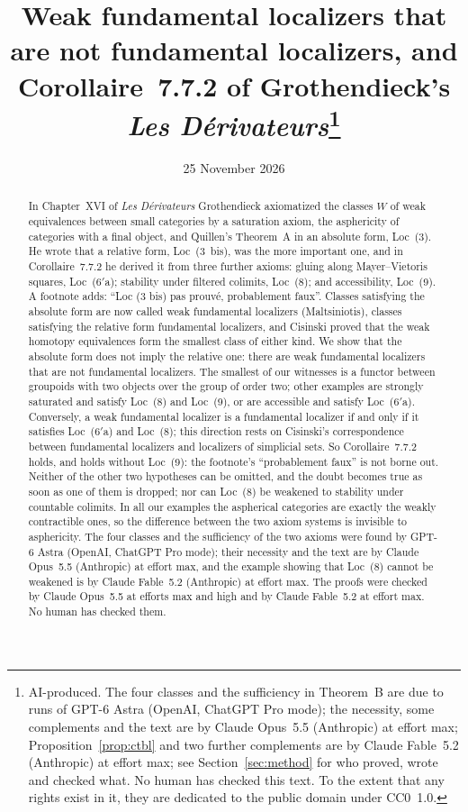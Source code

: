 \documentclass[11pt,a4paper]{article}
\title{Weak fundamental localizers that are not fundamental localizers,
and Corollaire~7.7.2 of Grothendieck's \emph{Les D\'erivateurs}\thanks{AI-produced.
The four classes and the sufficiency in Theorem~B are due to runs of GPT-6 Astra (OpenAI,
ChatGPT Pro mode); the necessity, some complements and the text are by Claude Opus~5.5
(Anthropic) at effort max; Proposition~\ref{prop:ctbl} and two further complements are by
Claude Fable~5.2 (Anthropic) at effort max; see Section~\ref{sec:method} for who proved, wrote
and checked what. No human has checked this text. To the extent that any
rights exist in it, they are dedicated to the public domain under CC0~1.0.}}
\author{}
\date{25 November 2026}
\theoremstyle{definition}
\begin{document}
\maketitle

\begin{abstract}
In Chapter~XVI of \emph{Les D\'erivateurs} Grothendieck axiomatized the classes $W$ of weak
equivalences between small categories by a saturation axiom, the asphericity of categories
with a final object, and Quillen's Theorem~A in an absolute form, Loc~(3). He wrote that a
relative form, Loc~(3~bis), was the more important one, and in Corollaire~7.7.2 he derived
it from three further axioms: gluing along Mayer--Vietoris squares, Loc~($6'$a); stability
under filtered colimits, Loc~(8); and accessibility, Loc~(9). A footnote adds: ``Loc (3 bis)
pas prouv\'e, probablement faux''. Classes satisfying the absolute form are now called weak
fundamental localizers (Maltsiniotis), classes satisfying the relative form fundamental
localizers, and Cisinski proved that the weak homotopy equivalences form the smallest class
of either kind. We show that the absolute form does not imply the relative one: there are
weak fundamental localizers that are not fundamental localizers. The smallest of our witnesses is a
functor between groupoids with two objects over the group of order two; other examples are
strongly saturated and satisfy Loc~(8) and Loc~(9), or are accessible and satisfy
Loc~($6'$a). Conversely, a weak fundamental localizer is a fundamental localizer if and only
if it satisfies Loc~($6'$a) and Loc~(8); this direction rests on Cisinski's correspondence
between fundamental localizers and localizers of simplicial sets. So Corollaire~7.7.2 holds,
and holds without Loc~(9): the footnote's ``probablement faux'' is not borne out. Neither of
the other two hypotheses can be omitted, and the doubt becomes true as soon as one of them is
dropped; nor can Loc~(8) be weakened to stability under countable colimits. In all our examples the
aspherical categories are exactly the weakly contractible ones, so the difference between the
two axiom systems is invisible to asphericity. The four classes and the sufficiency of the two axioms
were found by GPT-6 Astra (OpenAI, ChatGPT Pro mode); their necessity and the text are by
Claude Opus~5.5 (Anthropic) at effort max, and the example showing that Loc~(8) cannot be
weakened is by Claude Fable~5.2 (Anthropic) at effort max. The proofs were checked by Claude
Opus~5.5 at efforts max and high and by Claude Fable~5.2 at effort max. No human has checked
them.
\end{abstract}
\end{document}
